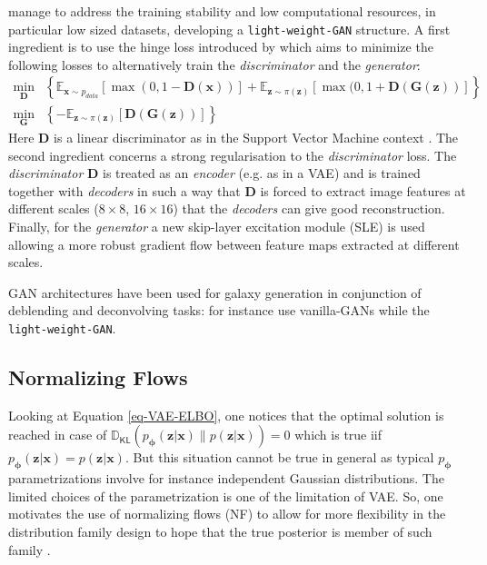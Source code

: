 \documentclass[11pt]{amsart}
\newcommand{\Esp}[0]{\ensuremath{\mathbb{E}}}
\newcommand{\DKL}[0]{\ensuremath{\mathbb{D}_{\mathsf{KL}}}}
\begin{document}
\cite{liu2021towards} manage to address the training stability and low  computational resources, in particular low sized datasets, developing a \texttt{light-weight-GAN} structure. A first ingredient is to use the hinge loss introduced by \cite{Lim2017} which aims to minimize the following losses to alternatively train the \textit{discriminator} and the \textit{generator}: 
\begin{align}
\min_{\bm{D}}& \left\{\Esp_{\bm{x}\sim p_{data}}[\max{(0,1-\bm{D}(\bm{x}))}] + \Esp_{\bm{z}\sim \pi(\bm{z})}[\max{(0,1+\bm{D}(\bm{G}(\bm{z}))}]
\right\}\\
\min_{\bm{G}} &\left\{-\Esp_{\bm{z}\sim \pi(\bm{z})}[\bm{D}(\bm{G}(\bm{z}))]
\right\}
\end{align}
Here $\bm{D}$ is a linear discriminator as in the Support Vector Machine context \citep{Vapnik1997}. The second ingredient concerns a strong regularisation to the \textit{discriminator} loss. The \textit{discriminator}  $\bm{D}$  is treated as an \textit{encoder} (e.g. as in a VAE) and is trained together with \textit{decoders} in such a way that $\bm{D}$ is forced to extract image features at different scales ($8\times 8$, $16\times 16$) that the \textit{decoders} can give good reconstruction. Finally, for the \textit{generator} a new skip-layer excitation module (SLE) is used allowing a more robust gradient flow between feature maps extracted at different scales.

GAN architectures have been used for galaxy generation in conjunction of deblending and deconvolving tasks: for instance \cite{Schawinski2017,Hemmati_2022} use vanilla-GANs while  \cite{Coccomini2021} the \texttt{light-weight-GAN}.
%
\subsection{Normalizing Flows}
\label{sec-NF}
%
Looking at Equation \ref{eq-VAE-ELBO}, one notices that the optimal solution is reached in case of $\DKL(p_{\bm{\phi}}(\bm{z}|\bm{x})\| p(\bm{z}|\bm{x}))=0$ which is true iif $p_{\bm{\phi}}(\bm{z}|\bm{x}) = p(\bm{z}|\bm{x})$. But this situation cannot be true in general as typical $p_{\bm{\phi}}$ parametrizations involve for instance independent Gaussian distributions. The limited choices of the parametrization is one of the limitation of VAE. So, one motivates the use of normalizing flows (NF) to allow for more flexibility in the distribution family design to hope that the true posterior is member of such family \citep{Tabak2010, Tabak2013a, Rezende2015}. 
\end{document}
